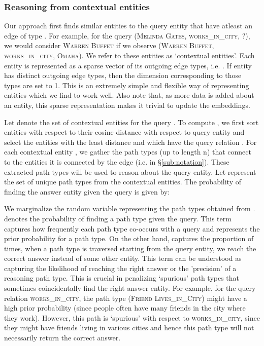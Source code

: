 \documentclass[11pt,a4paper]{article}
\begin{document}
\subsubsection{Reasoning from contextual entities}
\label{sub:contextual_entities}
Our approach first finds  similar entities to the  query entity that have atleast an edge of type . For example, for the query (\textsc{Melinda Gates}, \textsc{works\_in\_city}, ?), we would consider \textsc{Warren Buffet} if we observe (\textsc{Warren Buffet}, \textsc{works\_in\_city}, \textsc{Omaha}). We refer to these entities as `contextual entities'.  Each entity is represented as a sparse vector of its outgoing edge types, i.e. . If entity  has  distinct outgoing edge types, then the dimension corresponding to those types are set to 1. This is an extremely simple and flexible way of representing entities which we find to work well. Also note that, as more data is added about an entity, this sparse representation makes it trivial to update the embeddings.

Let  denote the set of contextual entities for the query . To compute , we first sort entities with respect to their cosine distance with respect to query entity and select the  entities with the least distance and which have the query relation . For each contextual entity , we gather the path types (up to length n) that connect  to the entities it is connected by the edge  (i.e.  in \S\ref{sub:notation}). These extracted path types will be used to reason about the query entity. Let  represent the set of unique path types from the contextual entities. The probability of finding the answer entity  given the query is given by:


We marginalize the random variable representing the path types obtained from .  denotes the probability of finding a path type given the query. This term captures how frequently each path type co-occurs with a query and represents the prior probability for a path type. On the other hand,    captures the proportion of times, when a path type  is traversed starting from the query entity, we reach the correct answer instead of some other entity. This term can be understood as capturing the likelihood of reaching the right answer or the 'precision' of a reasoning path type. This is crucial in penalizing `spurious' path types that sometimes coincidentally find the right answer entity. For example, for the query relation \textsc{works\_in\_city}, the path type (\textsc{Friend} \textsc{Lives\_in\_City}) might have a high prior probability (since people often have many friends in the city where they work). However, this path is `spurious' with respect to \textsc{works\_in\_city}, since they might have friends living in various cities and hence this path type will not necessarily return the correct answer.
\end{document}
